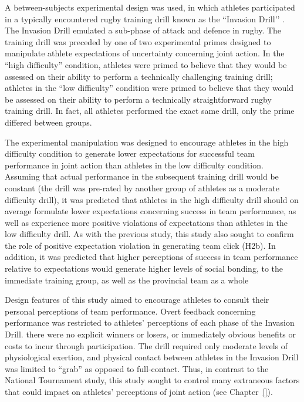 \begin{CJK}{UTF8}{gbsn}
A between-subjects experimental design was used, in which athletes participated in a typically encountered rugby training drill known as the ``Invasion Drill’’ \citep{Passos2011}.  The Invasion Drill emulated a sub-phase of attack and defence in rugby.  The training drill was preceded by one of two experimental primes designed to manipulate athlete expectations of uncertainty concerning joint action.  In the ``high difficulty'' condition, athletes were primed to believe that they would be assessed on their ability to perform a technically challenging training drill; athletes in the ``low difficulty'' condition were primed to believe that they would be assessed on their ability to perform a technically straightforward rugby training drill.  In fact, all athletes performed the exact same drill, only the prime differed between groups.

The experimental manipulation was designed to encourage athletes in the high difficulty condition to generate lower expectations for successful team performance in joint action than athletes in the low difficulty condition. Assuming that actual performance in the subsequent training drill would be constant (the drill was pre-rated by another group of athletes as a moderate difficulty drill), it was predicted that athletes in the high difficulty drill should on average formulate lower expectations concerning success in team performance, as well as experience more positive violations of expectations than athletes in the low difficulty drill.   As with the previous study, this study also sought to confirm the role of positive expectation violation in generating team click (H2b).  In addition, it was predicted that higher perceptions of success in team performance relative to expectations would generate higher levels of social bonding, to the immediate training group, as well as the provincial team as a whole

Design features of this study aimed to encourage athletes to consult their personal perceptions of team performance.  Overt feedback concerning performance was restricted to athletes' perceptions of each phase of the Invasion Drill.   there were no explicit winners or losers, or immediately obvious benefits or costs to incur through participation.  The drill required only moderate levels of physiological exertion, and physical contact between athletes in the Invasion Drill was limited to ``grab'' as opposed to full-contact.  Thus, in contrast to the   National Tournament study, this study sought to control many extraneous factors that could impact on athletes' perceptions of joint action (see Chapter~\ref{}).


\end{CJK}
